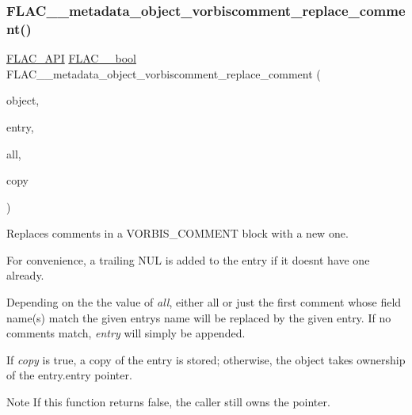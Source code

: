 \subsubsection{\texorpdfstring{F\+L\+A\+C\+\_\+\+\_\+metadata\+\_\+object\+\_\+vorbiscomment\+\_\+replace\+\_\+comment()}{FLAC\_\_metadata\_object\_vorbiscomment\_replace\_comment()}}
{\footnotesize\ttfamily \hyperlink{group__flac__export_ga56ca07df8a23310707732b1c0007d6f5}{F\+L\+A\+C\+\_\+\+A\+PI} \hyperlink{ordinals_8h_a95103469f1cbd78b8cf250194985b34e}{F\+L\+A\+C\+\_\+\+\_\+bool} F\+L\+A\+C\+\_\+\+\_\+metadata\+\_\+object\+\_\+vorbiscomment\+\_\+replace\+\_\+comment (\begin{DoxyParamCaption}\item[{\hyperlink{struct_f_l_a_c_____stream_metadata}{F\+L\+A\+C\+\_\+\+\_\+\+Stream\+Metadata} $\ast$}]{object,  }\item[{\hyperlink{struct_f_l_a_c_____stream_metadata___vorbis_comment___entry}{F\+L\+A\+C\+\_\+\+\_\+\+Stream\+Metadata\+\_\+\+Vorbis\+Comment\+\_\+\+Entry}}]{entry,  }\item[{\hyperlink{ordinals_8h_a95103469f1cbd78b8cf250194985b34e}{F\+L\+A\+C\+\_\+\+\_\+bool}}]{all,  }\item[{\hyperlink{ordinals_8h_a95103469f1cbd78b8cf250194985b34e}{F\+L\+A\+C\+\_\+\+\_\+bool}}]{copy }\end{DoxyParamCaption})}

Replaces comments in a V\+O\+R\+B\+I\+S\+\_\+\+C\+O\+M\+M\+E\+NT block with a new one.

For convenience, a trailing N\+UL is added to the entry if it doesn\textquotesingle{}t have one already.

Depending on the the value of {\itshape all}, either all or just the first comment whose field name(s) match the given entry\textquotesingle{}s name will be replaced by the given entry. If no comments match, {\itshape entry} will simply be appended.

If {\itshape copy} is {\ttfamily true}, a copy of the entry is stored; otherwise, the object takes ownership of the {\ttfamily entry.\+entry} pointer.

\begin{DoxyNote}{Note}
If this function returns {\ttfamily false}, the caller still owns the pointer.
\end{DoxyNote}

